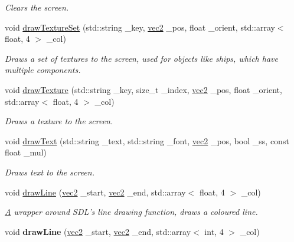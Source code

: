 \begin{DoxyCompactItemize}
\begin{DoxyCompactList}\small\item\em Clears the screen. \end{DoxyCompactList}\item 
void \hyperlink{classrenderer_aff2e7ad5dc4d7b8b26e496b5baa5a8de}{draw\-Texture\-Set} (std\-::string \-\_\-key, \hyperlink{structvec2}{vec2} \-\_\-pos, float \-\_\-orient, std\-::array$<$ float, 4 $>$ \-\_\-col)
\begin{DoxyCompactList}\small\item\em Draws a set of textures to the screen, used for objects like ships, which have multiple components. \end{DoxyCompactList}\item 
void \hyperlink{classrenderer_a6afff3128edc0e0caab88d51a1de022b}{draw\-Texture} (std\-::string \-\_\-key, size\-\_\-t \-\_\-index, \hyperlink{structvec2}{vec2} \-\_\-pos, float \-\_\-orient, std\-::array$<$ float, 4 $>$ \-\_\-col)
\begin{DoxyCompactList}\small\item\em Draws a texture to the screen. \end{DoxyCompactList}\item 
void \hyperlink{classrenderer_a430af103157a244d083c16b41a6b839b}{draw\-Text} (std\-::string \-\_\-text, std\-::string \-\_\-font, \hyperlink{structvec2}{vec2} \-\_\-pos, bool \-\_\-ss, const float \-\_\-mul)
\begin{DoxyCompactList}\small\item\em Draws text to the screen. \end{DoxyCompactList}\item 
void \hyperlink{classrenderer_a7c6f70612d8fc6e6c1d9520c73e81f94}{draw\-Line} (\hyperlink{structvec2}{vec2} \-\_\-start, \hyperlink{structvec2}{vec2} \-\_\-end, std\-::array$<$ float, 4 $>$ \-\_\-col)
\begin{DoxyCompactList}\small\item\em \hyperlink{struct_a}{A} wrapper around S\-D\-L's line drawing function, draws a coloured line. \end{DoxyCompactList}\item 
\hypertarget{classrenderer_a0a19a18380a5b0155a0741bc9cf5f1d5}{void {\bfseries draw\-Line} (\hyperlink{structvec2}{vec2} \-\_\-start, \hyperlink{structvec2}{vec2} \-\_\-end, std\-::array$<$ int, 4 $>$ \-\_\-col)}\label{classrenderer_a0a19a18380a5b0155a0741bc9cf5f1d5}


\end{DoxyCompactItemize}
